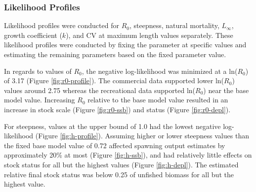 \documentclass[11pt,
  english,
  a4paper,
]{article}
\begin{document}

\hypertarget{likelihood-profiles}{%
\subsubsection{Likelihood Profiles}\label{likelihood-profiles}}

\leavevmode\tagmcend\tagstructend


Likelihood profiles were conducted for {\(R_0\)\leavevmode\tagmcend\tagstructend}, steepness, natural mortality, {\(L_{\infty}\)\leavevmode\tagmcend\tagstructend}, growth coefficient ({\(k\)\leavevmode\tagmcend\tagstructend}), and CV at maximum length values separately. These likelihood profiles were conducted by fixing the parameter at specific values and estimating the remaining parameters based on the fixed parameter value.

\leavevmode\tagmcend\tagstructend\par


In regards to values of {\(R_0\)\leavevmode\tagmcend\tagstructend}, the negative log-likelihood was minimized at a ln({\(R_0\)\leavevmode\tagmcend\tagstructend}) of 3.17 (Figure \ref{fig:r0-profile}). The commercial data supported lower ln({\(R_0\)\leavevmode\tagmcend\tagstructend}) values around 2.75 whereas the recreational data supported ln({\(R_0\)\leavevmode\tagmcend\tagstructend}) near the base model value. Increasing {\(R_0\)\leavevmode\tagmcend\tagstructend} relative to the base model value resulted in an increase in stock scale (Figure \ref{fig:r0-ssb}) and status (Figure \ref{fig:r0-depl}).

\leavevmode\tagmcend\tagstructend\par


For steepness, values at the upper bound of 1.0 had the lowest negative log-likelihood (Figure \ref{fig:h-profile}). Assuming higher or lower steepness values than the fixed base model value of 0.72 affected spawning output estimates by approximately 20\% at most (Figure \ref{fig:h-ssb}), and had relatively little effects on stock status for all but the highest values (Figure \ref{fig:h-depl}). The estimated relative final stock status was below 0.25 of unfished biomass for all but the highest value.
\end{document}
